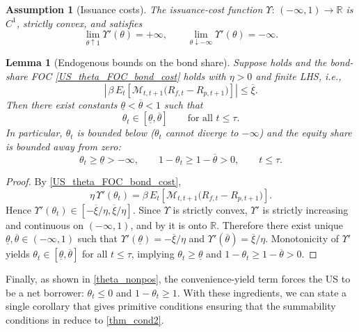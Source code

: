 \documentclass[12pt]{article}
\theoremstyle{plain}
\newtheorem{ass}{Assumption}
\newtheorem{lem}{Lemma}
\begin{document}
\begin{ass}[Issuance costs]\label{ass6}
The issuance-cost function $\Upsilon:\,(-\infty,1)\to\mathbb R$ is $C^1$, strictly convex, and satisfies
\[
\lim_{\theta\uparrow 1}\Upsilon'(\theta)=+\infty,
\qquad
\lim_{\theta\downarrow -\infty}\Upsilon'(\theta)=-\infty.
\]
\end{ass}

\begin{lem}[Endogenous bounds on the bond share]\label{lem2}
Suppose  holds and the bond-share FOC \eqref{US_theta_FOC_bond_cost} holds with $\eta>0$ and finite LHS,
i.e.,
\[
\left|\,\beta\,E_t\!\left[\mathcal M_{t,t+1}\bigl(R_{f,t}-R_{p,t+1}\bigr)\right]\right|\le \overline\xi.
\]
Then there exist constants $\underline\theta<\overline\theta<1$ such that
\[
\theta_t\in[\underline\theta,\overline\theta]
\qquad\text{for all }t\le\tau.
\]
In particular, $\theta_t$ is bounded below ($\theta_t$ cannot diverge to $-\infty$) and the equity share is
bounded away from zero:
\[
\theta_t \ge \underline\theta>-\infty,
\qquad
1-\theta_t \ge 1-\overline\theta>0,
\qquad t\le\tau.
\]
\end{lem}

\begin{proof}
By \eqref{US_theta_FOC_bond_cost},
\[
\eta\,\Upsilon'(\theta_t)
=\beta\,E_t\!\left[\mathcal M_{t,t+1}\bigl(R_{f,t}-R_{p,t+1}\bigr)\right].
\]
Hence $\Upsilon'(\theta_t)\in[-\overline\xi/\eta,\overline\xi/\eta]$. Since $\Upsilon$ is strictly convex,
$\Upsilon'$ is strictly increasing and continuous on $(-\infty,1)$, and by  it is onto $\mathbb R$.
Therefore there exist unique $\underline\theta,\overline\theta\in(-\infty,1)$ such that
$\Upsilon'(\underline\theta)=-\overline\xi/\eta$ and $\Upsilon'(\overline\theta)=\overline\xi/\eta$.
Monotonicity of $\Upsilon'$ yields $\theta_t\in[\underline\theta,\overline\theta]$ for all $t\le\tau$, implying
$\theta_t\ge \underline\theta$ and $1-\theta_t\ge 1-\overline\theta>0$.
\end{proof}


Finally, as shown in \eqref{theta_nonpos}, the convenience-yield term forces the US to be a net borrower:
$\theta_t\le 0$ and $1-\theta_t\ge 1$. With these ingredients, we can state a single corollary that 
gives primitive conditions ensuring that the
summability conditions in  reduce to \eqref{thm_cond2}.
\end{document}
